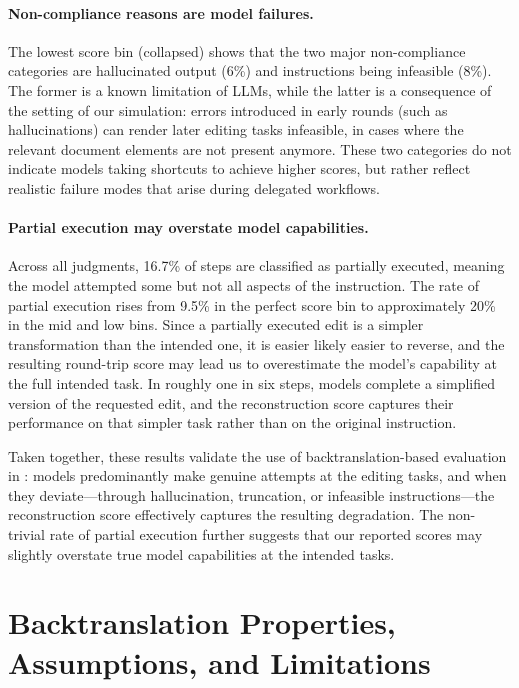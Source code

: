 \documentclass{article} %
\begin{document}
\paragraph{Non-compliance reasons are model failures.} The lowest score bin (collapsed) shows that the two major non-compliance categories are hallucinated output (6\%) and instructions being infeasible (8\%). The former is a known limitation of LLMs, while the latter is a consequence of the setting of our simulation: errors introduced in early rounds (such as hallucinations) can render later editing tasks infeasible, in cases where the relevant document elements are not present anymore. These two categories do not indicate models taking shortcuts to achieve higher scores, but rather reflect realistic failure modes that arise during delegated workflows.

\paragraph{Partial execution may overstate model capabilities.} Across all judgments, 16.7\% of steps are classified as partially executed, meaning the model attempted some but not all aspects of the instruction. The rate of partial execution rises from 9.5\% in the perfect score bin to approximately 20\% in the mid and low bins. Since a partially executed edit is a simpler transformation than the intended one, it is easier likely easier to reverse, and the resulting round-trip score may lead us to overestimate the model's capability at the full intended task. In roughly one in six steps, models complete a simplified version of the requested edit, and the reconstruction score captures their performance on that simpler task rather than on the original instruction.

Taken together, these results validate the use of backtranslation-based evaluation in \benchmark{}: models predominantly make genuine attempts at the editing tasks, and when they deviate---through hallucination, truncation, or infeasible instructions---the reconstruction score effectively captures the resulting degradation. The non-trivial rate of partial execution further suggests that our reported scores may slightly overstate true model capabilities at the intended tasks.


\section{Backtranslation Properties, Assumptions, and Limitations} \label{app:backtranslation}
\end{document}
